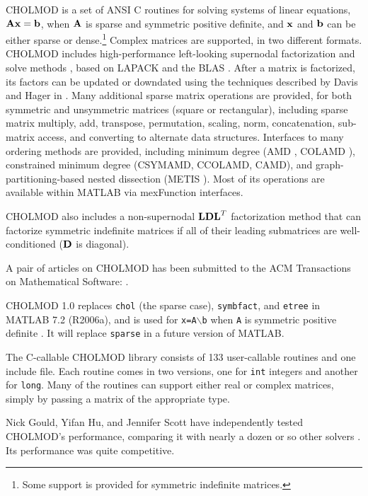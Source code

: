 \documentclass[11pt]{article}
\newcommand{\m}[1]{{\bf{#1}}}       %
\begin{document}
CHOLMOD is a set of ANSI C routines for solving systems of linear
equations, $\m{Ax}=\m{b}$, when $\m{A}$ is sparse and symmetric positive definite,
and $\m{x}$ and $\m{b}$ can be either sparse or dense.\footnote{Some support
is provided for symmetric indefinite matrices.}
Complex matrices are supported, in two different formats.
CHOLMOD includes high-performance left-looking supernodal factorization
and solve methods \cite{NgPeyton91b},
based on LAPACK \cite{LAPACK} and the BLAS \cite{ACM679a}.
After a matrix is factorized, its factors can be updated or downdated using
the techniques described by Davis and Hager
in \cite{DavisHager99,DavisHager01,DavisHager05}.
Many additional sparse matrix operations are provided, for both
symmetric and unsymmetric matrices (square or rectangular), including
sparse matrix multiply, add, transpose, permutation, scaling,
norm, concatenation, sub-matrix access, and converting to alternate data structures.
Interfaces to many ordering methods are provided, including minimum degree
(AMD \cite{AmestoyDavisDuff96,AmestoyDavisDuff03},
COLAMD \cite{DavisGilbertLarimoreNg00_algo,DavisGilbertLarimoreNg00}),
constrained minimum degree (CSYMAMD, CCOLAMD, CAMD), and
graph-partitioning-based nested dissection (METIS \cite{KarypisKumar98}).
Most of its operations are available within MATLAB via mexFunction interfaces.

    CHOLMOD also includes a non-supernodal $\m{LDL}^T$ factorization method
    that can factorize symmetric indefinite matrices if all of their
    leading submatrices are well-conditioned ($\m{D}$ is diagonal).

A pair of articles on CHOLMOD has been submitted to the ACM Transactions
on Mathematical Software:
\cite{ChenDavisHagerRajamanickam06,DavisHager06}.

CHOLMOD 1.0 replaces {\tt chol} (the sparse case), {\tt symbfact}, and {\tt etree}
in MATLAB 7.2 (R2006a), and is used for {\tt x=A}$\backslash${\tt b}
when {\tt A} is symmetric positive definite \cite{GilbertMolerSchreiber}.
It will replace {\tt sparse} in a future version of MATLAB.

The C-callable CHOLMOD library consists of 133 user-callable routines and one
include file.  Each routine comes in two versions, one for {\tt int} integers
and another for {\tt long}.  Many of the routines can support either real or
complex matrices, simply by passing a matrix of the appropriate type.

Nick Gould, Yifan Hu, and Jennifer Scott have independently tested CHOLMOD's
performance, comparing it with nearly a dozen or so other solvers
\cite{GouldHuScott05,GouldHuScott05b}.  Its performance was quite competitive.
\end{document}
